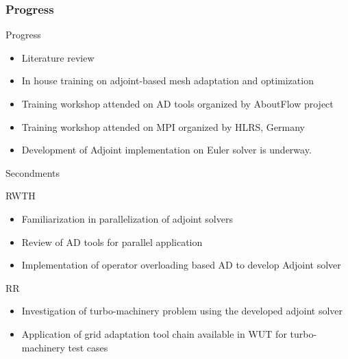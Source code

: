 
\begin{frame}
\frametitle{Progress}
\begin{block}{Progress}
\begin{itemize}
\item Literature review
\item In house training on adjoint-based mesh adaptation and optimization
\item Training workshop attended on AD tools organized by AboutFlow project
\item Training workshop attended on MPI organized by HLRS, Germany
\item Development of Adjoint implementation on Euler solver is underway.
\end{itemize}
\end{block}
\end{frame}

\begin{frame}{Secondments}

\begin{block}{RWTH}
\begin{itemize}
\item Familiarization in parallelization of adjoint solvers
\item Review of AD tools for parallel application
\item Implementation of operator overloading based AD to develop Adjoint solver

\end{itemize}
\end{block}

\begin{block}{RR}
\begin{itemize}
\item Investigation of turbo-machinery problem using the developed adjoint solver 
\item Application of grid adaptation tool chain available in WUT for turbo-machinery test cases
\end{itemize}
\end{block}
\end{frame}


